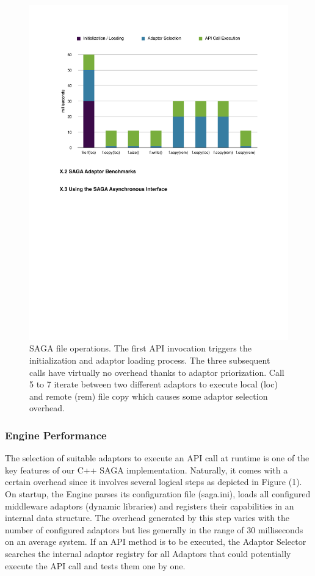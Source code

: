 \begin{figure}[!ht]
  \begin{center}
      \includegraphics[width=1\textwidth]{../figures/perf_overhead.pdf}
  \end{center}
 \up\up\up\up\up
  \caption{\small SAGA file operations. The first API invocation triggers the initialization and adaptor loading process. The three subsequent calls have virtually no overhead thanks to adaptor priorization. Call 5 to 7 iterate between two different adaptors to execute local (loc) and remote (rem) file copy which causes some adaptor selection overhead.}
 \label{perf_overhead}
\end{figure}

\subsubsection{Engine Performance}\label{perf_engine}
The selection of suitable adaptors to execute an API call at runtime is one of the key features of our C++ SAGA implementation. Naturally, it comes with a certain overhead since it involves several logical steps as depicted in Figure (1). On startup, the Engine parses its configuration file (saga.ini), loads all configured middleware adaptors (dynamic libraries) and registers their capabilities in an internal data structure. The overhead generated by this step varies with the number of configured adaptors but lies generally in the range of 30 milliseconds on an average system. 
If an API method is to be executed, the Adaptor Selector searches the internal adaptor registry for all Adaptors that could potentially execute the API call and tests them one by one.

